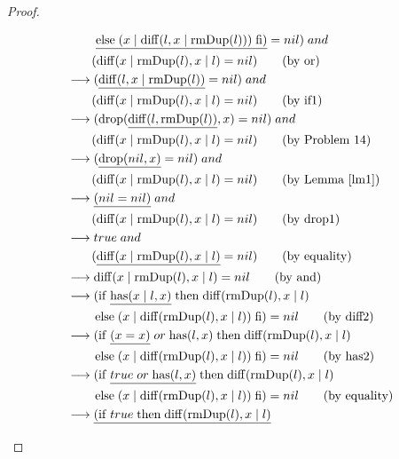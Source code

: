 \documentclass[12pt, a4paper]{article}
\newcommand{\rel}[1]{\mathrel{#1}}
\newcommand{\rmx}[1]{\mathrm{#1}}
\newcommand{\larrow}{\longrightarrow}
\newcommand{\under}{\underline}
\begin{document}
\begin{proof}
\begin{description}
\begin{align*}
	&\quad \quad\ \under{\rel{\rmx{else}} (x \mid \rmx{diff}(l, x \mid \rmx{rmDup}(l))) \rel{\rmx{fi}})} = nil) \rel{and} \\
	&\quad \quad (\rmx{diff}(x \mid \rmx{rmDup}(l), x \mid l) = nil) \tag{by or} \\
	&\larrow (\under{\rmx{diff}(l, x \mid \rmx{rmDup}(l))} = nil) \rel{and} \\
	&\quad \quad (\rmx{diff}(x \mid \rmx{rmDup}(l), x \mid l) = nil) \tag{by if1} \\
	&\larrow (\rmx{drop}(\under{\rmx{diff}(l, \rmx{rmDup}(l))}, x) = nil) \rel{and} \\
	&\quad \quad (\rmx{diff}(x \mid \rmx{rmDup}(l), x \mid l) = nil) \tag{by Problem 14} \\
	&\larrow (\under{\rmx{drop}(nil, x)} = nil) \rel{and} \\
	&\quad \quad (\rmx{diff}(x \mid \rmx{rmDup}(l), x \mid l) = nil) \tag{by Lemma~\ref{lm1}} \\
	&\larrow \under{(nil = nil)} \rel{and} \\
	&\quad \quad (\rmx{diff}(x \mid \rmx{rmDup}(l), x \mid l) = nil) \tag{by drop1} \\
	&\larrow true \rel{and} \\
	&\quad \quad (\under{\rmx{diff}(x \mid \rmx{rmDup}(l), x \mid l)} = nil) \tag{by equality} \\
	&\larrow \rmx{diff}(x \mid \rmx{rmDup}(l), x \mid l) = nil \tag{by and} \\
	&\larrow (\rel{\rmx{if}} \under{\rmx{has}(x \mid l, x)} \rel{\rmx{then}} \rmx{diff}(\rmx{rmDup}(l), x \mid l) \\
	&\quad \quad \rel{\rmx{else}} (x \mid \rmx{diff}(\rmx{rmDup}(l), x \mid l)) \rel{\rmx{fi}}) = nil \tag{by diff2} \\
	&\larrow (\rel{\rmx{if}} \under{(x = x)} \rel{or} \rmx{has}(l, x) \rel{\rmx{then}} \rmx{diff}(\rmx{rmDup}(l), x \mid l) \\
	&\quad \quad \rel{\rmx{else}} (x \mid \rmx{diff}(\rmx{rmDup}(l), x \mid l)) \rel{\rmx{fi}}) = nil \tag{by has2} \\
	&\larrow (\rel{\rmx{if}} \under{true \rel{or} \rmx{has}(l, x)} \rel{\rmx{then}} \rmx{diff}(\rmx{rmDup}(l), x \mid l) \\
	&\quad \quad \rel{\rmx{else}} (x \mid \rmx{diff}(\rmx{rmDup}(l), x \mid l)) \rel{\rmx{fi}}) = nil \tag{by equality} \\
	&\larrow \under{(\rel{\rmx{if}} true \rel{\rmx{then}} \rmx{diff}(\rmx{rmDup}(l), x \mid l)} \\

\end{align*}
\end{description}
\end{proof}
\end{document}

